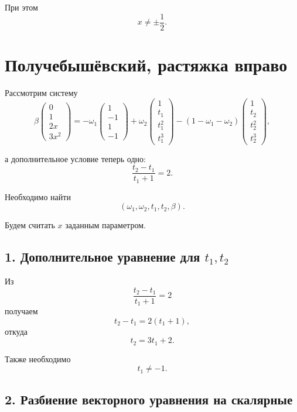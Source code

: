 \documentclass[12pt,a4paper]{article}
\begin{document}
	При этом
	\[
	x\neq\pm\frac12.
	\]
	
	
	\newpage
	\section{Получебышёвский, растяжка вправо}
	
	Рассмотрим систему
	\begin{equation}
		\beta
		\begin{pmatrix}
			0\\
			1\\
			2x\\
			3x^2
		\end{pmatrix}
		=
		-\omega_1
		\begin{pmatrix}
			1\\
			-1\\
			1\\
			-1
		\end{pmatrix}
		+
		\omega_2
		\begin{pmatrix}
			1\\
			t_1\\
			t_1^2\\
			t_1^3
		\end{pmatrix}
		-
		(1-\omega_1-\omega_2)
		\begin{pmatrix}
			1\\
			t_2\\
			t_2^2\\
			t_2^3
		\end{pmatrix},
	\end{equation}
	
	а дополнительное условие теперь одно:
	\begin{equation}
		\frac{t_2-t_1}{t_1+1}=2.
		\tag{1}
	\end{equation}
	
	Необходимо найти
	\[
	(\omega_1,\omega_2,t_1,t_2,\beta).
	\]
	
	Будем считать $x$ заданным параметром.
	
	\subsection*{1. Дополнительное уравнение для $t_1,t_2$}
	
	Из
	\[
	\frac{t_2-t_1}{t_1+1}=2
	\]
	получаем
	\[
	t_2-t_1=2(t_1+1),
	\]
	откуда
	\[
	\boxed{t_2=3t_1+2}.
	\tag{2}
	\]
	
	Также необходимо
	\[
	\boxed{t_1\neq -1}.
	\tag{3}
	\]
	
	\subsection*{2. Разбиение векторного уравнения на скалярные}
	
\end{document}

